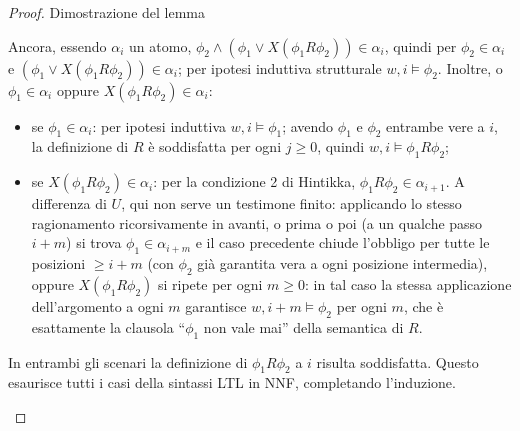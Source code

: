 \begin{proof}{Dimostrazione del lemma}
\begin{description}
\begin{description}
    \end{description}
    \item[\(\phi' = \phi_1 R \phi_2\).] Ancora, essendo \(\alpha_i\) un atomo, \(\phi_2\land(\phi_1\lor X(\phi_1R\phi_2))\in\alpha_i\), quindi per \(\phi_2\in\alpha_i\) e \((\phi_1\lor X(\phi_1R\phi_2))\in\alpha_i\); per ipotesi induttiva strutturale \(w,i\models\phi_2\). Inoltre, o \(\phi_1\in\alpha_i\) oppure \(X(\phi_1R\phi_2)\in\alpha_i\):
    \begin{itemize}
      \item se \(\phi_1\in\alpha_i\): per ipotesi induttiva \(w,i\models\phi_1\); avendo \(\phi_1\) e \(\phi_2\) entrambe vere a \(i\), la definizione di \(R\) è soddisfatta per ogni \(j\ge0\), quindi \(w,i\models\phi_1R\phi_2\);
      \item se \(X(\phi_1R\phi_2)\in\alpha_i\): per la condizione 2 di Hintikka, \(\phi_1R\phi_2\in\alpha_{i+1}\). A differenza di \(U\), qui non serve un testimone finito: applicando lo stesso ragionamento ricorsivamente in avanti, o prima o poi (a un qualche passo \(i+m\)) si trova \(\phi_1\in\alpha_{i+m}\) e il caso precedente chiude l'obbligo per tutte le posizioni \(\ge i+m\) (con \(\phi_2\) già garantita vera a ogni posizione intermedia), oppure \(X(\phi_1R\phi_2)\) si ripete per ogni \(m\ge0\): in tal caso la stessa applicazione dell'argomento a ogni \(m\) garantisce \(w,i{+}m\models\phi_2\) per ogni \(m\), che è esattamente la clausola \enquote{\(\phi_1\) non vale mai} della semantica di \(R\).
    \end{itemize}
    In entrambi gli scenari la definizione di \(\phi_1R\phi_2\) a \(i\) risulta soddisfatta.
    Questo esaurisce tutti i casi della sintassi LTL in NNF, completando l'induzione.
    \end{description}
  \end{proof}

